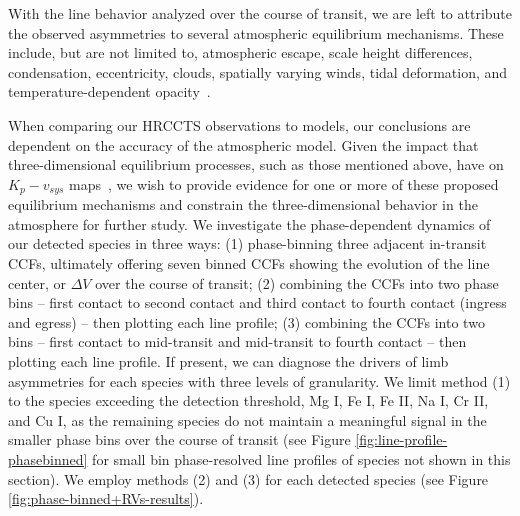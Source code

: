 \documentclass[twocolumn]{aastex631}
\begin{document}
        With the line behavior analyzed over the course of transit, we are left to attribute the observed asymmetries to several atmospheric equilibrium mechanisms. These include, but are not limited to, atmospheric escape, scale height differences, condensation, eccentricity, clouds, spatially varying winds, tidal deformation, and temperature-dependent opacity~\citep{Savel2023}. 

        When comparing our HRCCTS observations to models, our conclusions are dependent on the accuracy of the atmospheric model. Given the impact that three-dimensional equilibrium processes, such as those mentioned above, have on $K_p-v_{sys}$ maps~\citep{Wardenier2021}, we wish to provide evidence for one or more of these proposed equilibrium mechanisms and constrain the three-dimensional behavior in the atmosphere for further study. We investigate the phase-dependent dynamics of our detected species in three ways: (1) phase-binning three adjacent in-transit CCFs, ultimately offering seven binned CCFs showing the evolution of the line center, or $\Delta V$ over the course of transit; (2) combining the CCFs into two phase bins -- first contact to second contact and third contact to fourth contact (ingress and egress) -- then plotting each line profile; (3) combining the CCFs into two bins -- first contact to mid-transit and mid-transit to fourth contact -- then plotting each line profile. If present, we can diagnose the drivers of limb asymmetries for each species with three levels of granularity. We limit method (1) to the species exceeding the detection threshold, Mg I, Fe I, Fe II, Na I, Cr II, and Cu I, as the remaining species do not maintain a meaningful signal in the smaller phase bins over the course of transit (see Figure \ref{fig:line-profile-phasebinned} for small bin phase-resolved line profiles of species not shown in this section). We employ methods (2) and (3) for each detected species (see Figure \ref{fig:phase-binned+RVs-results}). 
\end{document}
